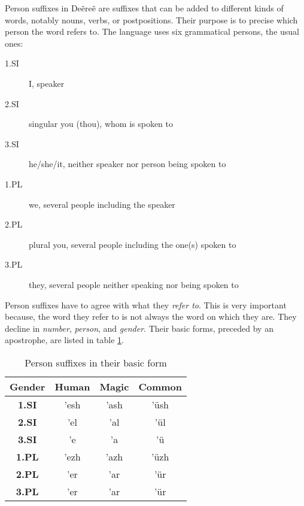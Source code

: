 Person suffixes in Deẽreẽ are suffixes that can be added to different kinds of words,
notably nouns, verbs, or postpositions.
Their purpose is to precise which person the word refers to. The language uses six grammatical persons, the usual ones:

\begin{description}
\item[1.SI] I, speaker
\item[2.SI] singular you (thou), whom is spoken to
\item[3.SI] he/she/it, neither speaker nor person being spoken to
\item[1.PL] we, several people including the speaker
\item[2.PL] plural you, several people including the one(s) spoken to
\item[3.PL] they, several people neither speaking nor being spoken to
\end{description}

Person suffixes have to agree with what they \emph{refer to}. This is very important because, the
word they refer to is not always the word on which they are. They decline in \emph{number},
\emph{person}, and \emph{gender}. Their basic forms, preceded by an apostrophe, are listed in table
\ref{tab:morph-basic-pers-suff}.

\begin{table}[h]
\begin{center}
\begin{tabular}{|c|c|c|c|}
\hline
\textbf{Gender} & \textbf{Human} & \textbf{Magic} & \textbf{Common}\\\hline
\textbf{1.SI}                    & ’esh & ’ash & ’üsh \\\hline
\textbf{2.SI}                    & ’el  & ’al  & ’ül  \\\hline
\textbf{3.SI}                    & ’e   & ’a   & ’ü   \\\hline
\textbf{1.PL}                    & ’ezh & ’azh & ’üzh \\\hline
\textbf{2.PL}                    & ’er  & ’ar  & ’ür  \\\hline
\textbf{3.PL}                    & ’er  & ’ar  & ’ür  \\\hline
\end{tabular}
\end{center}
\caption{Person suffixes in their basic form}
\label{tab:morph-basic-pers-suff}
\end{table}

